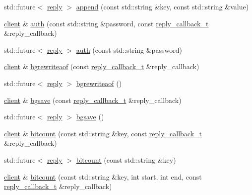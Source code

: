 \begin{DoxyCompactItemize}
\item 
std\+::future$<$ \hyperlink{classcpp__redis_1_1reply}{reply} $>$ \hyperlink{classcpp__redis_1_1client_a3e50dddad0b4c9eca58d970bdc4e78da}{append} (const std\+::string \&key, const std\+::string \&value)
\item 
\hyperlink{classcpp__redis_1_1client}{client} \& \hyperlink{classcpp__redis_1_1client_a3ee834ca9c0810d2eafcf04de9dc0670}{auth} (const std\+::string \&password, const \hyperlink{classcpp__redis_1_1client_a061a1140d36d2eaeda82b09a0bb3f9f2}{reply\+\_\+callback\+\_\+t} \&reply\+\_\+callback)
\item 
std\+::future$<$ \hyperlink{classcpp__redis_1_1reply}{reply} $>$ \hyperlink{classcpp__redis_1_1client_a899b98d4d6da0ffdf8780933fe088fd1}{auth} (const std\+::string \&password)
\item 
\hyperlink{classcpp__redis_1_1client}{client} \& \hyperlink{classcpp__redis_1_1client_a9873619c2c1ff820fde17e27ade096c8}{bgrewriteaof} (const \hyperlink{classcpp__redis_1_1client_a061a1140d36d2eaeda82b09a0bb3f9f2}{reply\+\_\+callback\+\_\+t} \&reply\+\_\+callback)
\item 
std\+::future$<$ \hyperlink{classcpp__redis_1_1reply}{reply} $>$ \hyperlink{classcpp__redis_1_1client_a82959607f4cbe9dac195d27621a9cc64}{bgrewriteaof} ()
\item 
\hyperlink{classcpp__redis_1_1client}{client} \& \hyperlink{classcpp__redis_1_1client_a102a4f3572072a5bc26681082ad16a2b}{bgsave} (const \hyperlink{classcpp__redis_1_1client_a061a1140d36d2eaeda82b09a0bb3f9f2}{reply\+\_\+callback\+\_\+t} \&reply\+\_\+callback)
\item 
std\+::future$<$ \hyperlink{classcpp__redis_1_1reply}{reply} $>$ \hyperlink{classcpp__redis_1_1client_a632ef40c52f46eb4948768006adfead5}{bgsave} ()
\item 
\hyperlink{classcpp__redis_1_1client}{client} \& \hyperlink{classcpp__redis_1_1client_aa6c9c15d8676a1cee3d8409ab898a049}{bitcount} (const std\+::string \&key, const \hyperlink{classcpp__redis_1_1client_a061a1140d36d2eaeda82b09a0bb3f9f2}{reply\+\_\+callback\+\_\+t} \&reply\+\_\+callback)
\item 
std\+::future$<$ \hyperlink{classcpp__redis_1_1reply}{reply} $>$ \hyperlink{classcpp__redis_1_1client_ac667b96661726874bc237c84de1ddd89}{bitcount} (const std\+::string \&key)
\item 
\hyperlink{classcpp__redis_1_1client}{client} \& \hyperlink{classcpp__redis_1_1client_ac631a06c8b69a2f1b4de3aabc19d68e2}{bitcount} (const std\+::string \&key, int start, int end, const \hyperlink{classcpp__redis_1_1client_a061a1140d36d2eaeda82b09a0bb3f9f2}{reply\+\_\+callback\+\_\+t} \&reply\+\_\+callback)

\end{DoxyCompactItemize}
